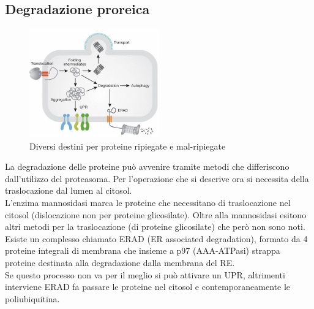     \subsection{Degradazione proreica}
    \begin{figure}[h]
            \centering
            \includegraphics[width=0.5\textwidth]{images/degradazione.JPG}
            \caption{\small Diversi destini per proteine ripiegate e mal-ripiegate}
            \label{fig:mesh1}
        \end{figure}
        La degradazione delle proteine può avvenire tramite metodi che differiscono dall'utilizzo del proteasoma. Per l'operazione che si descrive ora si necessita della traslocazione dal lumen al citosol.\\
        L'enzima mannosidasi marca le proteine che necessitano di traslocazione nel citosol (dislocazione non per proteine glicosilate). Oltre alla mannosidasi esitono altri metodi per la traslocazione (di proteine glicosilate) che però non sono noti.\\
        Esiste un complesso chiamato ERAD (ER associated degradation), formato da 4 proteine integrali di membrana che insieme a p97 (AAA-ATPasi) strappa proteine destinata alla degradazione dalla membrana del RE. \\
        Se questo processo non va per il meglio si può attivare un UPR, altrimenti interviene ERAD fa passare le proteine nel citosol e contemporaneamente le poliubiquitina.
        

\pagebreak